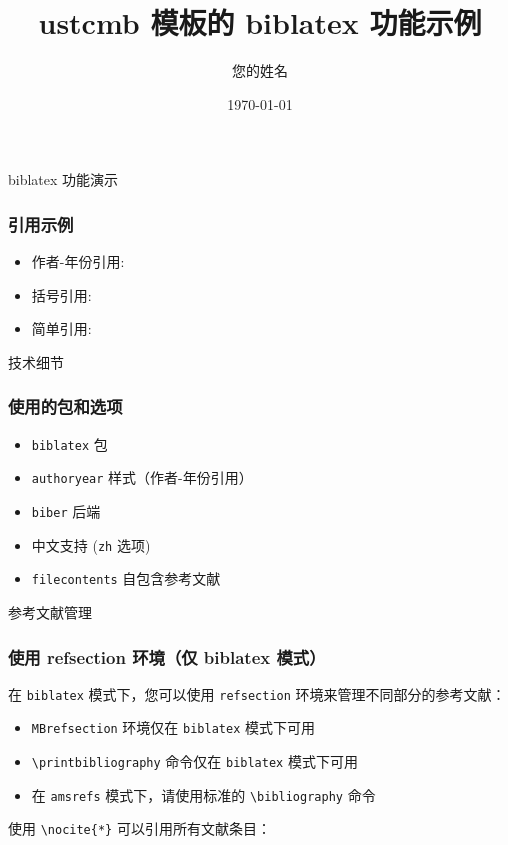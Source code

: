 \documentclass[biblatex,authoryear,zh]{ustcmb}
\title[ustcmb biblatex示例]{ustcmb 模板的 biblatex 功能示例}
\author[作者]{您的姓名}
\institute[机构]{您的机构}
\date{\today}
\begin{document}
\frame{\titlepage}

\begin{frame}{biblatex 功能演示}
  \frametitle{引用示例}
  
  \begin{itemize}
    \item 作者-年份引用: \textcite{SibnerSibnerUhlenbeck1989Solutions}
    \item 括号引用: \parencite{AtiyahBott1983Yang}
    \item 简单引用: \cite{EellsSampson1964Harmonic}
  \end{itemize}
\end{frame}

\begin{frame}{技术细节}
  \frametitle{使用的包和选项}
  
  \begin{itemize}
    \item \texttt{biblatex} 包
    \item \texttt{authoryear} 样式（作者-年份引用）
    \item \texttt{biber} 后端
    \item 中文支持 (\texttt{zh} 选项)
    \item \texttt{filecontents} 自包含参考文献
  \end{itemize}
\end{frame}

\begin{frame}[fragile]{参考文献管理}
  \frametitle{使用 refsection 环境（仅 biblatex 模式）}
  
  在 \texttt{biblatex} 模式下，您可以使用 \texttt{refsection} 环境来管理不同部分的参考文献：
  
  \makeatletter
  \ifMB@biblatex
    \begin{MBrefsection}
      \nocite{EellsSampson1964Harmonic,AtiyahBott1983Yang}
      \printbibliography[heading=subbibliography,title=经典文献]
    \end{MBrefsection}
  \else
    \begin{itemize}
      \item \texttt{MBrefsection} 环境仅在 \texttt{biblatex} 模式下可用
      \item \texttt{\textbackslash printbibliography} 命令仅在 \texttt{biblatex} 模式下可用
      \item 在 \texttt{amsrefs} 模式下，请使用标准的 \texttt{\textbackslash bibliography} 命令
    \end{itemize}
  \fi
  \makeatother
  
  \vspace{1em}
  
  使用 \texttt{\textbackslash nocite\{*\}} 可以引用所有文献条目：
  
  \nocite{*}
\end{frame}

\end{document}
